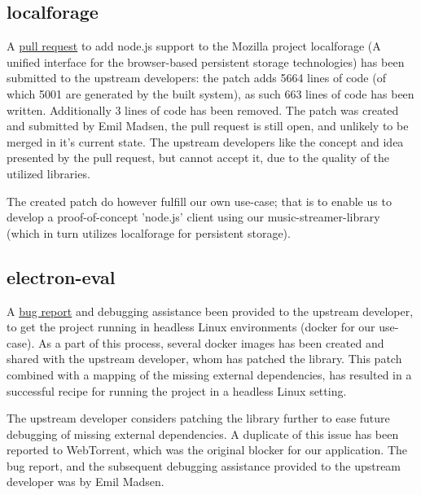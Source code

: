 \subsection{localforage}
\label{subsec:appendix-localforage}
A \href{https://github.com/mozilla/localForage/pull/551}{pull request} to add 
node.js support to the Mozilla project localforage (A unified interface for 
the browser-based persistent storage technologies) has been submitted to the
upstream developers: the patch adds 5664 lines of code (of which 5001 are 
generated by the built system), as such 663 lines of code has been written.
Additionally 3 lines of code has been removed.
\newline\newline
The patch was created and submitted by Emil Madsen, the pull request is still
open, and unlikely to be merged in it's current state. The upstream developers
like the concept and idea presented by the pull request, but cannot accept it,
due to the quality of the utilized libraries.

The created patch do however fulfill our own use-case; that is to enable us to 
develop a proof-of-concept 'node.js' client using our music-streamer-library
(which in turn utilizes localforage for persistent storage).

\subsection{electron-eval}
\label{subsec:appendix-electron-eval}
A \href{https://github.com/mappum/electron-eval/issues/29}{bug report} and 
debugging assistance been provided to the upstream developer, to get the project
running in headless Linux environments (docker for our use-case).
\newline\newline
As a part of this process, several docker images has been created and shared
with the upstream developer, whom has patched the library. This patch combined
with a mapping of the missing external dependencies, has resulted in a
successful recipe for running the project in a headless Linux setting.

The upstream developer considers patching the library further to ease future 
debugging of missing external dependencies. A duplicate of this issue has been
reported to WebTorrent, which was the original blocker for our application.
\newline\newline
The bug report, and the subsequent debugging assistance provided to the
upstream developer was by Emil Madsen.


